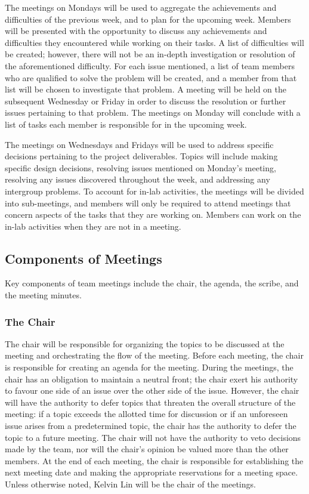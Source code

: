 \documentclass{article}
\begin{document}
The meetings on Mondays will be used to aggregate the achievements and 
difficulties of the previous week, and to plan for the upcoming week. Members 
will be presented with the opportunity to discuss any achievements and 
difficulties they encountered while working on their tasks. A list of difficulties 
will be created; however, there will not be an in-depth investigation or 
resolution of the aforementioned difficulty. For each issue mentioned, a list of 
team members who are qualified to solve the problem will be created, and a 
member from that list will be chosen to investigate that problem. A meeting will 
be held on the subsequent Wednesday or Friday in order to discuss the resolution 
or further issues pertaining to that problem. The meetings on Monday will 
conclude with a list of tasks each member is responsible for in the upcoming 
week.

The meetings on Wednesdays and Fridays will be used to address specific 
decisions pertaining to the project deliverables. Topics will include making 
specific design decisions, resolving issues mentioned on Monday's meeting, 
resolving any issues discovered throughout the week, and addressing any 
intergroup problems. To account for in-lab activities, the meetings will be 
divided into sub-meetings, and members will only be required to attend meetings 
that concern aspects of the tasks that they are working on. Members can work on 
the in-lab activities when they are not in a meeting. 

\subsection{Components of Meetings}
Key components of team meetings include the chair, the agenda, the scribe, and 
the meeting minutes.

\subsubsection{The Chair}
The chair will be responsible for organizing the topics to be discussed at the 
meeting and orchestrating the flow of the meeting. Before each meeting, the 
chair is responsible for creating an agenda for the meeting. During the 
meetings, the chair has an obligation to maintain a neutral front; the chair 
exert his authority to favour one side of an issue over the other side of the 
issue. However, the chair will have the authority to defer topics that threaten 
the overall structure of the meeting: if a topic exceeds the allotted time for 
discussion or if an unforeseen issue arises from a predetermined topic, the 
chair has the authority to defer the topic to a future meeting. The chair will 
not have the authority to veto decisions made by the team, nor will the chair's 
opinion be valued more than the other members. At the end of each meeting, the 
chair is responsible for establishing the next meeting date and making the 
appropriate reservations for a meeting space. Unless otherwise noted, Kelvin Lin 
will be the chair of the meetings.
\end{document}
